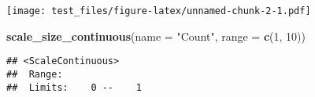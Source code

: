 \documentclass[
]{article}
\newenvironment{Shaded}{\begin{snugshade}}{\end{snugshade}}
\newcommand{\AttributeTok}[1]{\textcolor[rgb]{0.13,0.29,0.53}{#1}}
\newcommand{\DecValTok}[1]{\textcolor[rgb]{0.00,0.00,0.81}{#1}}
\newcommand{\FunctionTok}[1]{\textcolor[rgb]{0.13,0.29,0.53}{\textbf{#1}}}
\newcommand{\NormalTok}[1]{#1}
\newcommand{\StringTok}[1]{\textcolor[rgb]{0.31,0.60,0.02}{#1}}
\begin{document}
\texttt{[image: test\_files/figure-latex/unnamed-chunk-2-1.pdf]}

\begin{Shaded}
\begin{Highlighting}[]
  \FunctionTok{scale\_size\_continuous}\NormalTok{(}\AttributeTok{name =} \StringTok{"Count"}\NormalTok{, }\AttributeTok{range =} \FunctionTok{c}\NormalTok{(}\DecValTok{1}\NormalTok{, }\DecValTok{10}\NormalTok{)) }
\end{Highlighting}
\end{Shaded}

\begin{verbatim}
## <ScaleContinuous>
##  Range:  
##  Limits:    0 --    1
\end{verbatim}
\end{document}
